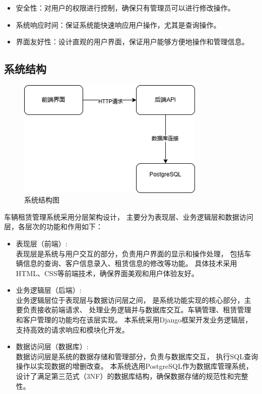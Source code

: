 \documentclass[UTF8,a4paper,12pt]{ctexart}
\begin{document}
\begin{itemize}
    \item 安全性：对用户的权限进行控制，确保只有管理员可以进行修改操作。
    \item 系统响应时间：保证系统能快速响应用户操作，尤其是查询操作。
    \item 界面友好性：设计直观的用户界面，保证用户能够方便地操作和管理信息。
\end{itemize}


\subsection{系统结构}

\begin{figure}[htbp]  %
    \centering  %
    \includegraphics[width=0.8\textwidth]{pic/sap.png}  %
    \caption{系统结构图}  %
    \label{fig:sap}  %
\end{figure}

车辆租赁管理系统采用分层架构设计，
主要分为表现层、业务逻辑层和数据访问层，各层次的功能和作用如下：

\begin{itemize}
    \item 表现层（前端）:\\
    表现层是系统与用户交互的部分，负责用户界面的显示和操作处理，
    包括车辆信息的查询、客户信息录入、租赁信息的修改等功能。
    具体技术采用HTML、CSS等前端技术，确保界面美观和用户体验友好。
    \item 业务逻辑层（后端）:\\
    业务逻辑层位于表现层与数据访问层之间，
    是系统功能实现的核心部分，主要负责接收前端请求、
    处理业务逻辑并与数据库交互。车辆管理、租赁管理和客户管理的功能均在该层实现。
    本系统采用Django框架开发业务逻辑层，
    支持高效的请求响应和模块化开发。
    
    \item 数据访问层（数据库）:\\
    数据访问层是系统的数据存储和管理部分，负责与数据库交互，
    执行SQL查询操作以实现数据的增删改查。
    本系统选用PostgreSQL作为数据库管理系统，
    设计了满足第三范式（3NF）的数据库结构，确保数据存储的规范性和完整性。
\end{itemize}
\end{document}

